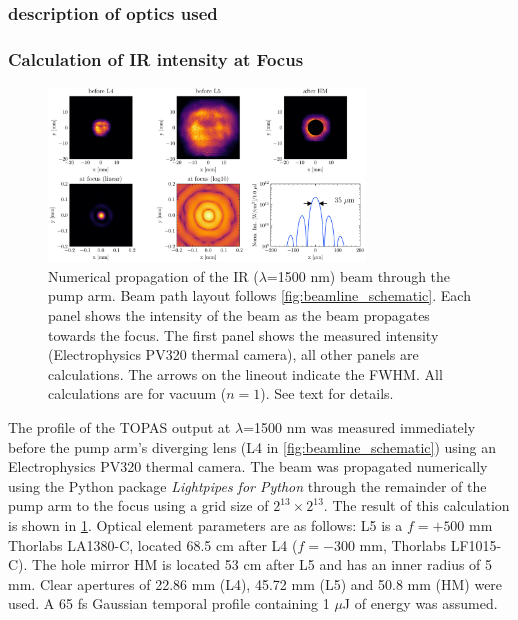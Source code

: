 \subsubsection{description of optics used}

\subsubsection{Calculation of IR intensity at Focus}

\begin{figure}
	\centering
	\includegraphics[width=0.75\textwidth]{figures/chap2/pump_on_focus_calculation_8192_inferno.pdf}
	\caption{Numerical propagation of the IR ($\lambda$=1500 nm) beam through the pump arm. Beam path layout follows \cref{fig:beamline_schematic}. Each panel shows the intensity of the beam as the beam propagates towards the focus. The first panel shows the measured intensity (Electrophysics PV320 thermal camera), all other panels are calculations. The arrows on the lineout indicate the FWHM. All calculations are for vacuum ($n=1$). See text for details.}
	\label{fig:pump_on_focus_calculation}
\end{figure}

The profile of the TOPAS output at $\lambda$=1500 nm was measured immediately before the pump arm's diverging lens (L4 in \cref{fig:beamline_schematic}) using an Electrophysics PV320 thermal camera. The beam was propagated numerically using the Python package \textit{Lightpipes for Python} \cite{vdovinLightPipesPython} through the remainder of the pump arm to the focus using a grid size of $2^{13}\times2^{13}$. The result of this calculation is shown in \cref{fig:pump_on_focus_calculation}. Optical element parameters are as follows: L5 is a $f = +500 \text{ mm}$ Thorlabs LA1380-C, located 68.5 cm after L4 ($f = -300 \text{ mm}$, Thorlabs LF1015-C). The hole mirror HM is located 53 cm after L5 and has an inner radius of 5 mm. Clear apertures of 22.86 mm (L4), 45.72 mm (L5) and 50.8 mm (HM) were used. A 65 fs Gaussian temporal profile containing 1 $\mu$J of energy was assumed.

